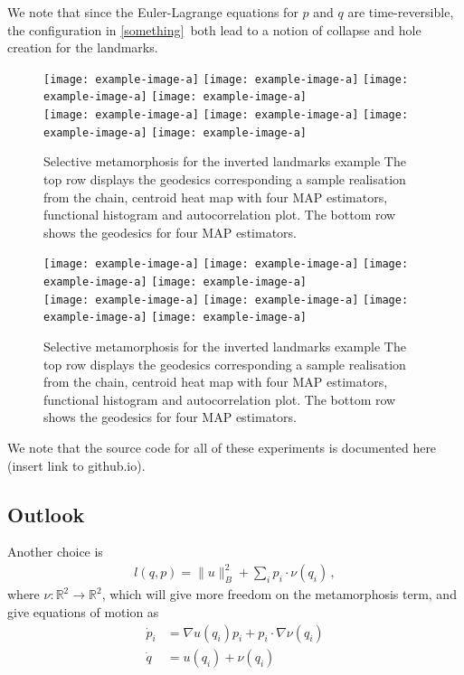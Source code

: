 \documentclass{article}
\begin{document}
We note that since the Euler-Lagrange equations for $p$ and $q$ are
time-reversible, the configuration in \ref{something} both lead to a notion of
collapse and hole creation for the landmarks.\\

\begin{figure}
\centering
\begin{minipage}{\textwidth}
  \centering
    \texttt{[image: example-image-a]}\quad
    \texttt{[image: example-image-a]}\quad
    \texttt{[image: example-image-a]}\quad
    \texttt{[image: example-image-a]}\\[0.25cm]
    \texttt{[image: example-image-a]}\quad
    \texttt{[image: example-image-a]}\quad
    \texttt{[image: example-image-a]}\quad
    \texttt{[image: example-image-a]}
    \caption{Selective metamorphosis for the inverted landmarks example The top
    row displays the geodesics corresponding a sample realisation from the
    chain, centroid heat map with four MAP estimators, functional histogram and
    autocorrelation plot. The bottom row shows the geodesics for four MAP
    estimators.}
    \label{fig:selective:crossing}
\end{minipage}
\end{figure}


\begin{figure}
\centering
\begin{minipage}{\textwidth}
  \centering
    \texttt{[image: example-image-a]}\quad
    \texttt{[image: example-image-a]}\quad
    \texttt{[image: example-image-a]}\quad
    \texttt{[image: example-image-a]}\\[0.25cm]
    \texttt{[image: example-image-a]}\quad
    \texttt{[image: example-image-a]}\quad
    \texttt{[image: example-image-a]}\quad
    \texttt{[image: example-image-a]}
    \caption{Selective metamorphosis for the inverted landmarks example The top
    row displays the geodesics corresponding a sample realisation from the
    chain, centroid heat map with four MAP estimators, functional histogram and
    autocorrelation plot. The bottom row shows the geodesics for four MAP
    estimators.}
    \label{fig:selective:crossing}
\end{minipage}
\end{figure}

We note that the source code for all of these experiments is documented
here (insert link to github.io). 

\subsection{Outlook}\label{sec:outlook}
Another choice is 
\begin{align}
    l(q,p) = \|u\|_B^2 + \sum_i p_i\cdot \nu(q_i) \, , 
\end{align}
where $\nu:\mathbb R^2 \to \mathbb R^2$, which will give more freedom on the metamorphosis term, and give equations of motion as 
\begin{align}
    \dot p_i  &= \nabla u(q_i)p_i  + p_i \cdot \nabla \nu(q_i)\\
    \dot q &= u(q_i) + \nu(q_i) 
\end{align}
\end{document}
